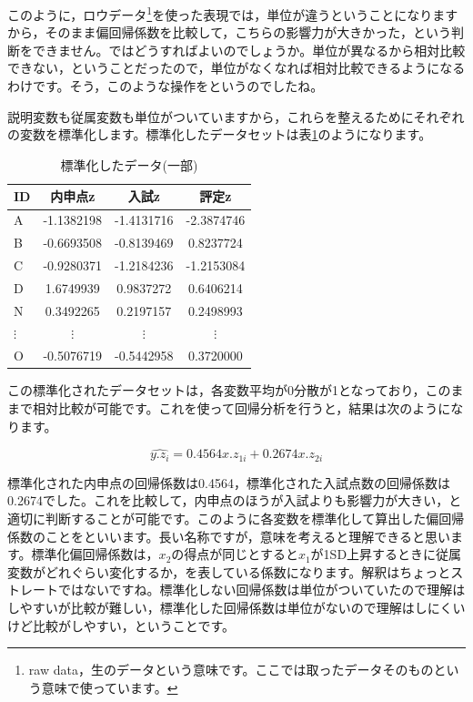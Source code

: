 \documentclass{ltjbook}
\begin{document}
このように，ロウデータ\footnote{raw data，生のデータという意味です。ここでは取ったデータそのものという意味で使っています。}を使った表現では，単位が違うということになりますから，そのまま偏回帰係数を比較して，こちらの影響力が大きかった，という判断をできません。ではどうすればよいのでしょうか。単位が異なるから相対比較できない，ということだったので，単位がなくなれば相対比較できるようになるわけです。そう，このような操作をというのでしたね。

説明変数も従属変数も単位がついていますから，これらを整えるためにそれぞれの変数を標準化します。標準化したデータセットは表\ref{tbl::10_03}のようになります。

\begin{table}[ht]
	\caption{標準化したデータ(一部)}
	\centering
	\begin{tabular}[t]{l|ccc}
		\hline
		ID       & 内申点z       & 入試z        & 評定z        \\
		\hline
		A        & -1.1382198 & -1.4131716 & -2.3874746 \\
		B        & -0.6693508 & -0.8139469 & 0.8237724  \\
		C        & -0.9280371 & -1.2184236 & -1.2153084 \\
		D        & 1.6749939  & 0.9837272  & 0.6406214  \\
		N        & 0.3492265  & 0.2197157  & 0.2498993  \\
		$\vdots$ & $\vdots$   & $\vdots$   & $\vdots$   \\
		O        & -0.5076719 & -0.5442958 & 0.3720000  \\
		\hline
	\end{tabular}
	\label{tbl::10_03}
\end{table}

この標準化されたデータセットは，各変数平均が0分散が1となっており，このままで相対比較が可能です。これを使って回帰分析を行うと，結果は次のようになります。

\[ \hat{y.z_i} = 0.4564 x.z_{1i} + 0.2674 x.z_{2i} \]

標準化された内申点の回帰係数は0.4564，標準化された入試点数の回帰係数は0.2674でした。これを比較して，内申点のほうが入試よりも影響力が大きい，と適切に判断することが可能です。このように各変数を標準化して算出した偏回帰係数のことをといいます。長い名称ですが，意味を考えると理解できると思います。標準化偏回帰係数は，$x_2$の得点が同じとすると$x_1$が1SD上昇するときに従属変数がどれぐらい変化するか，を表している係数になります。解釈はちょっとストレートではないですね。標準化しない回帰係数は単位がついていたので理解はしやすいが比較が難しい，標準化した回帰係数は単位がないので理解はしにくいけど比較がしやすい，ということです。
\end{document}
